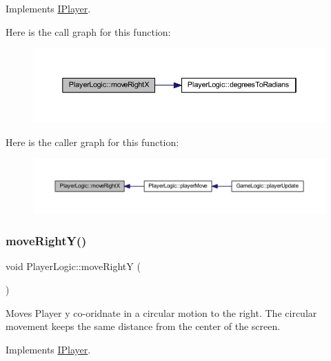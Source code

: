 Implements \hyperlink{class_i_player_a59f3be9939ee5406cb215845b6cf00c4}{I\+Player}.

Here is the call graph for this function\+:
\nopagebreak
\begin{figure}[H]
\begin{center}
\leavevmode
\includegraphics[width=350pt]{class_player_logic_a9c96291506bb5347f2c503bba4100fd4_cgraph}
\end{center}
\end{figure}
Here is the caller graph for this function\+:
\nopagebreak
\begin{figure}[H]
\begin{center}
\leavevmode
\includegraphics[width=350pt]{class_player_logic_a9c96291506bb5347f2c503bba4100fd4_icgraph}
\end{center}
\end{figure}
\mbox{\label{class_player_logic_a4b77bba06ba630f974aaa85306109485}} 
\subsubsection{\texorpdfstring{move\+Right\+Y()}{moveRightY()}}
{\footnotesize\ttfamily void Player\+Logic\+::move\+RightY (\begin{DoxyParamCaption}{ }\end{DoxyParamCaption})\hspace{0.3cm}{\ttfamily [virtual]}}



Moves Player y co-\/oridnate in a circular motion to the right. The circular movement keeps the same distance from the center of the screen. 



Implements \hyperlink{class_i_player_ae0c49a2900ebbfa951f24bc1bf4bb382}{I\+Player}.

